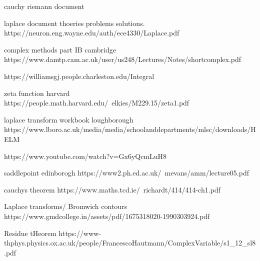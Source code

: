 
cauchy riemann document
%

laplace document thoeries problems solutions.
% 
https://neuron.eng.wayne.edu/auth/ece4330/Laplace.pdf
%

complex methods part IB cambridge 
%
https://www.damtp.cam.ac.uk/user/us248/Lectures/Notes/shortcomplex.pdf
%

%
https://williamsgj.people.charleston.edu/Integral%
%

zeta function harvard
%
https://people.math.harvard.edu/~elkies/M229.15/zeta1.pdf
%

laplace transform workbook loughborough
%
https://www.lboro.ac.uk/media/media/schoolanddepartments/mlsc/downloads/HELM%
%

%
https://www.youtube.com/watch?v=Gx6yQcmLuH8
%

saddlepoint edinborogh
%
https://www2.ph.ed.ac.uk/~mevans/amm/lecture05.pdf
%

cauchys theorem
%
https://www.maths.tcd.ie/~richardt/414/414-ch1.pdf
%

Laplace transforms/ Bromwich contours
%
https://www.gmdcollege.in/assets/pdf/1675318020-1990303924.pdf
%

Residue tHeorem
%
https://www-thphys.physics.ox.ac.uk/people/FrancescoHautmann/ComplexVariable/s1_12_sl8.pdf
%